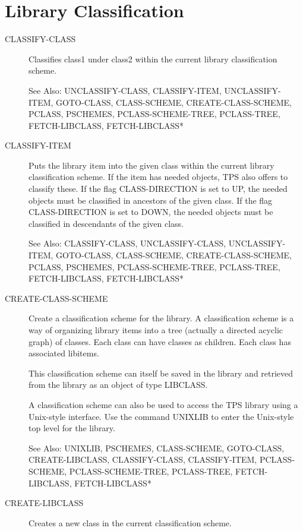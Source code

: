 \section{Library Classification}

\begin{description} 
\item[CLASSIFY-CLASS]  
Classifies class1 under class2 within the current library classification scheme.

See Also: UNCLASSIFY-CLASS, CLASSIFY-ITEM, UNCLASSIFY-ITEM,
GOTO-CLASS, CLASS-SCHEME, CREATE-CLASS-SCHEME, PCLASS, PSCHEMES,
PCLASS-SCHEME-TREE, PCLASS-TREE, FETCH-LIBCLASS, FETCH-LIBCLASS*

\item[CLASSIFY-ITEM]  
Puts the library item into the given class within the
current library classification scheme.  If the item has needed objects,
TPS also offers to classify these.  If the flag CLASS-DIRECTION
is set to UP, the needed objects must be classified in ancestors
of the given class.  If the flag CLASS-DIRECTION is set to DOWN, 
the needed objects must be classified in descendants of the given class.  

See Also: CLASSIFY-CLASS, UNCLASSIFY-CLASS, UNCLASSIFY-ITEM,
GOTO-CLASS, CLASS-SCHEME, CREATE-CLASS-SCHEME, PCLASS, PSCHEMES,
PCLASS-SCHEME-TREE, PCLASS-TREE, FETCH-LIBCLASS, FETCH-LIBCLASS*

\item[CREATE-CLASS-SCHEME]  
Create a classification scheme for the library.  A classification scheme
is a way of organizing library items into a tree (actually 
a directed acyclic graph) of classes.  Each class can have 
classes as children.  Each class has associated libitems.

This classification scheme can itself be saved in the library
and retrieved from the library as an object of type LIBCLASS.

A classification scheme can also be used to access the TPS
library using a Unix-style interface.  Use the command
UNIXLIB to enter the Unix-style top level for the library.

See Also: UNIXLIB, PSCHEMES, CLASS-SCHEME, GOTO-CLASS, CREATE-LIBCLASS, 
CLASSIFY-CLASS, CLASSIFY-ITEM, PCLASS-SCHEME, PCLASS-SCHEME-TREE, 
PCLASS-TREE, FETCH-LIBCLASS, FETCH-LIBCLASS*

\item[CREATE-LIBCLASS]  
Creates a new class in the current classification scheme.


\end{description}
